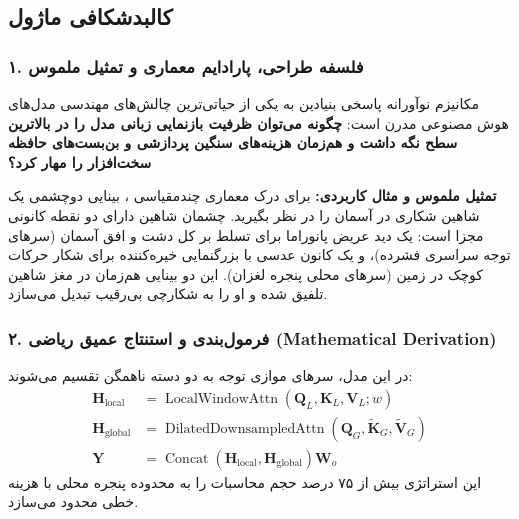 \subsection{کالبدشکافی ماژول }

\subsubsection*{۱. فلسفه طراحی، پارادایم معماری و تمثیل ملموس}
مکانیزم نوآورانه  پاسخی بنیادین به یکی از حیاتی‌ترین چالش‌های مهندسی مدل‌های هوش مصنوعی مدرن است: \textbf{چگونه می‌توان ظرفیت بازنمایی زبانی مدل را در بالاترین سطح نگه داشت و هم‌زمان هزینه‌های سنگین پردازشی و بن‌بست‌های حافظه سخت‌افزار را مهار کرد؟}

\textbf{تمثیل ملموس و مثال کاربردی:}
برای درک معماری چندمقیاسی ، بینایی دوچشمی یک شاهین شکاری در آسمان را در نظر بگیرید. چشمان شاهین دارای دو نقطه کانونی مجزا است: یک دید عریض پانوراما برای تسلط بر کل دشت و افق آسمان (سرهای توجه سراسری فشرده)، و یک کانون عدسی با بزرگنمایی خیره‌کننده برای شکار حرکات کوچک در زمین (سرهای محلی پنجره لغزان). این دو بینایی هم‌زمان در مغز شاهین تلفیق شده و او را به شکارچی بی‌رقیب تبدیل می‌سازد.

\subsubsection*{۲. فرمول‌بندی و استنتاج عمیق ریاضی (Mathematical Derivation)}
در این مدل، سرهای موازی توجه به دو دسته ناهمگن تقسیم می‌شوند:
\begin{align}
\mathbf{H}_{\text{local}} &= \operatorname{LocalWindowAttn}(\mathbf{Q}_L, \mathbf{K}_L, \mathbf{V}_L; w) \\
\mathbf{H}_{\text{global}} &= \operatorname{DilatedDownsampledAttn}(\mathbf{Q}_G, \tilde{\mathbf{K}}_G, \tilde{\mathbf{V}}_G) \\
\mathbf{Y} &= \operatorname{Concat}(\mathbf{H}_{\text{local}}, \mathbf{H}_{\text{global}}) \mathbf{W}_o
\end{align}
این استراتژی بیش از ۷۵ درصد حجم محاسبات را به محدوده پنجره محلی با هزینه خطی محدود می‌سازد.

